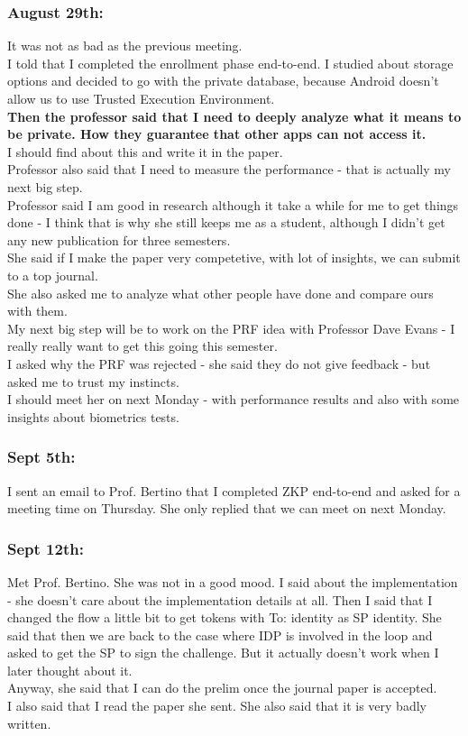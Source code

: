 \documentclass[11pt]{article}
\begin{document}
\subsubsection*{August 29th:}
It was not as bad as the previous meeting.\\
I told that I completed the enrollment phase end-to-end. I studied about storage options and decided to go with the private database, because Android 
doesn't allow us to use Trusted Execution Environment.\\
\textbf{Then the professor said that I need to deeply analyze what it means to be private. How they guarantee that other apps can not access it.}\\
I should find about this and write it in the paper.\\
Professor also said that I need to measure the performance - that is actually my next big step.\\
Professor said I am good in research although it take a while for me to get things done - I think that is why she still keeps me as a student, 
although I didn't get any new publication for three semesters.\\
She said if I make the paper very competetive, with lot of insights, we can submit to a top journal.\\
She also asked me to analyze what other people have done and compare ours with them.\\
My next big step will be to work on the PRF idea with Professor Dave Evans - I really really want to get this going this semester.\\
I asked why the PRF was rejected - she said they do not give feedback - but asked me to trust my instincts.\\
I should meet her on next Monday - with performance results and also with some insights about biometrics tests.\\

\subsubsection*{Sept 5th:}
I sent an email to Prof. Bertino that I completed ZKP end-to-end and asked for a meeting time on Thursday. She only replied that we can meet on next 
Monday.

\subsubsection*{Sept 12th:}
Met Prof. Bertino. She was not in a good mood. I said about the implementation - she doesn't care about the implementation details at all. 
Then I said that I changed the flow a little bit to get tokens with To: identity as SP identity. She said that then we are back to the case where IDP 
is involved in the loop and asked to get the SP to sign the challenge. But it actually doesn't work when I later thought about it.\\
Anyway, she said that I can do the prelim once the journal paper is accepted. \\
I also said that I read the paper she sent. She also said that it is very badly written.\\
\end{document}

